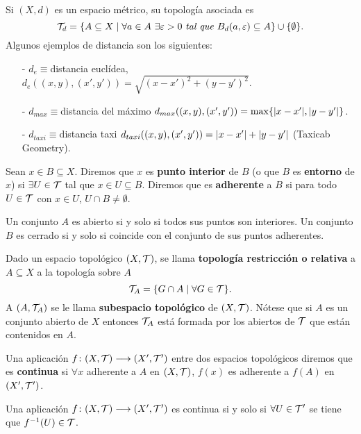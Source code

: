 \documentclass[GTS.tex]{subfiles}
\begin{document}
\begin{ej} Si $(X,d)$ es un espacio métrico, su topología asociada es
\[
\Tau_d=\{A\subseteq X\mid\forall a\in A\ \exists\varepsilon>0\ \textit{tal\ que } B_d(a,\varepsilon)\subseteq A\}\cup\{\emptyset\}.
\]
Algunos ejemplos de distancia son los siguientes:
\begin{enumerate}
\item[-] $d_e\equiv$distancia euclídea, $d_e((x,y),(x',y'))=\sqrt{(x-x')^2+(y-y')^2}$.
\item[-] $d_{max}\equiv$distancia del máximo $d_{max}((x,y),(x',y'))=\max\{\lvert x-x'\rvert,\lvert y-y'\rvert\}$.
\item[-] $d_{taxi}\equiv$distancia taxi $d_{taxi}((x,y),(x',y'))=\lvert x-x'\rvert+\lvert y-y'\rvert$ (Taxicab Geometry).
\end{enumerate}
\end{ej}

\begin{defi}Sean $x\in B\subseteq X$. Diremos que $x$ es \textbf{punto interior} de $B$ (o que $B$ es \textbf{entorno} de $x$) si $\exists U\in\mathcal{T}$ tal que $x\in U\subseteq B$. Diremos que es \textbf{adherente} a $B$ si para todo $U\in\mathcal{T}$ con $x\in U$, $U\cap B\neq\emptyset$.
\end{defi}

\begin{prop} Un conjunto $A$ es abierto si y solo si todos sus puntos son interiores. Un conjunto $B$ es cerrado si y solo si coincide con el conjunto de sus puntos adherentes.
\end{prop}

\begin{defi}
Dado un espacio topológico $(X,\mathcal{T})$, se llama \textbf{topología restricción o relativa } a $A\subseteq X$ a la topología sobre $A$
\[
\mathcal{T}_A=\{G\cap A\mid\forall G\in \mathcal{T}\}.
\]
A $(A,\mathcal{T}_A)$ se le llama \textbf{subespacio topológico} de $(X,\mathcal{T})$. Nótese que si $A$ es un conjunto abierto de $X$ entonces $\mathcal{T}_A$ está formada por los abiertos de $\mathcal{T}$ que están contenidos en $A$.
\end{defi}

\begin{defi} Una aplicación $f\colon{(X,\mathcal{T})}\longrightarrow{(X',\mathcal{T}')}$ entre dos espacios topológicos diremos que es \textbf{continua} si $\forall x$ adherente a $A$ en $(X,\mathcal{T})$, $f(x)$ es adherente a $f(A)$ en $(X',\mathcal{T}')$.
\end{defi}
\begin{prop} Una aplicación $f\colon{(X,\mathcal{T})}\longrightarrow{(X',\mathcal{T}')}$ es continua si y solo si $\forall U \in \mathcal{T}'$ se tiene que $f^{-1}(U)\in\mathcal{T}$.
\end{prop}
\end{document}
